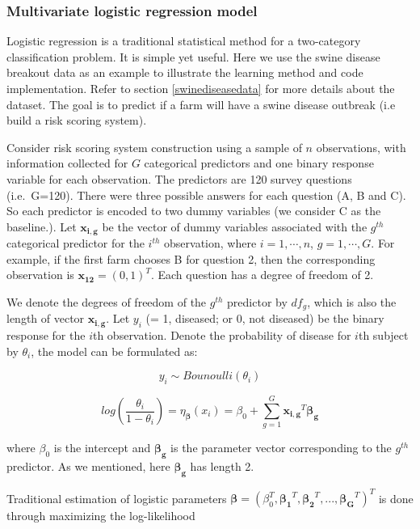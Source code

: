 \documentclass[
  12pt,
]{krantz}
\begin{document}
\hypertarget{multivariate-logistic-regression-model}{%
\subsubsection{Multivariate logistic regression model}\label{multivariate-logistic-regression-model}}

Logistic regression is a traditional statistical method for a two-category classification problem. It is simple yet useful. Here we use the swine disease breakout data as an example to illustrate the learning method and code implementation. Refer to section \ref{swinediseasedata} for more details about the dataset. The goal is to predict if a farm will have a swine disease outbreak (i.e build a risk scoring system).

Consider risk scoring system construction using a sample of \(n\) observations, with information collected for \(G\) categorical predictors and one binary response variable for each observation. The predictors are 120 survey questions (i.e.~G=120). There were three possible answers for each question (A, B and C). So each predictor is encoded to two dummy variables (we consider C as the baseline.). Let \(\mathbf{x_{i,g}}\) be the vector of dummy variables associated with the \(g^{th}\) categorical predictor for the \(i^{th}\) observation, where \(i=1,\cdots,n\), \(g=1,\cdots,G\). For example, if the first farm chooses B for question 2, then the corresponding observation is \(\mathbf{x_{12}}=(0,1)^{T}\). Each question has a degree of freedom of 2.

We denote the degrees of freedom of the \(g^{th}\) predictor by \(df_g\), which is also the length of vector \(\mathbf{x_{i,g}}\). Let \(y_i\) (= 1, diseased; or 0, not diseased) be the binary response for the \(i\)th observation. Denote the probability
of disease for \(i\)th subject by \(\theta_i\), the model can be formulated as:

\[y_{i}\sim Bounoulli(\theta_{i})\]

\[log\left(\frac{\theta_{i}}{1-\theta_{i}}\right)=\eta_{\mathbf{\beta}}(x_{i})=\beta_{0}+\sum_{g=1}^{G}\mathbf{x_{i,g}}^{T}\mathbf{\beta_{g}}\]

where \(\beta_{0}\) is the intercept and \(\mathbf{\beta_{g}}\) is the parameter vector corresponding to the \(g^{th}\) predictor. As we mentioned, here \(\mathbf{\beta_{g}}\) has length 2.

Traditional estimation of logistic
parameters \(\mathbf{\beta}=(\beta_{0}^{T},\mathbf{\beta_{1}}^{T},\mathbf{\beta_{2}}^{T},...,\mathbf{\beta_{G}}^{T})^{T}\) is done through maximizing the log-likelihood
\end{document}
